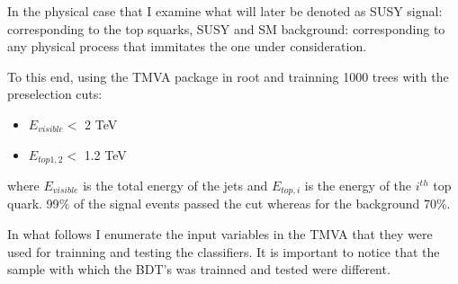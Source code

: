 \documentclass[12pt,a4paper]{report}
\begin{document}
In the physical case that I examine what will later be denoted as SUSY signal: corresponding to the 
top squarks, SUSY and SM background: corresponding to any physical process that immitates the one under 
consideration.

To this end, using the TMVA package in root and trainning 1000 trees with the  preselection cuts:

\begin{itemize}
 \item $E_{visible} <$ 2 TeV
 \item $E_{top 1,2} <$ 1.2 TeV
\end{itemize}

where $E_{visible}$ is the total energy of the jets and $E_{top,i}$ is the energy of the $i^{th}$ top quark.
99$\%$ of the signal events passed the cut whereas for the background 70$\%$.

In what follows I enumerate the input variables in the TMVA that they were used for trainning and testing 
the classifiers. It is important to notice that the sample with which the BDT's was trainned and tested were
different.
\end{document}
